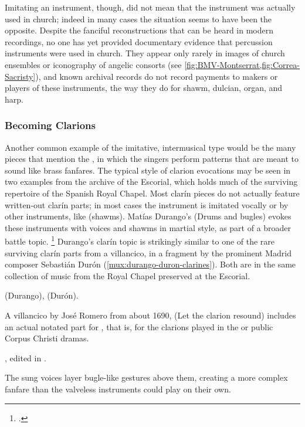 Imitating an instrument, though, did not mean that the instrument was actually
used in church; indeed in many cases the situation seems to have been the
opposite.
Despite the fanciful reconstructions that can be heard in modern recordings, no
one has yet provided documentary evidence that percussion instruments were used
in church.
They appear only rarely in images of church ensembles or iconography of angelic
consorts (see \cref{fig:BMV-Montserrat,fig:Correa-Sacristy}), and known
archival records do not record payments to makers or players of these
instruments, the way they do for shawm, dulcian, organ, and harp.%
    \citXXX[evidence needed]

\subsubsection{Becoming Clarions}

Another common example of the imitative, intermusical type would be the many
pieces that mention the  , in which the
singers perform patterns that are meant to sound like brass fanfares.
The typical style of clarion evocations may be seen in two examples from the
archive of the Escorial, which holds much of the surviving repertoire of the
Spanish Royal Chapel.
Most clarín pieces do not actually feature written-out clarín parts; in most
cases the instrument is imitated vocally or by other instruments, like
 (shawms).
Matías Durango's  (Drums and bugles) evokes these
instruments with voices and shawms in martial style, as part of a broader
battle topic.%
    \footnote{.}
Durango's clarín topic is strikingly similar to one of the rare surviving
clarín parts from a villancico, in a fragment by the prominent Madrid composer
Sebastián Durón (\cref{mux:durango-duron-clarines}). 
Both are in the same collection of music from the Royal Chapel preserved at the
Escorial.%
\begin{Footnote}
     (Durango),  (Durón).
\end{Footnote}
A villancico by José Romero from about 1690,  (Let the
clarion resound) includes an actual notated part for , that is, for the clarions played in the 
or public Corpus Christi dramas.%
\begin{Footnote} 
    , edited in \autocite[655--661]{CaberoPueyo:PhD}.
\end{Footnote}
The sung voices layer bugle-like gestures above them, creating a more complex
fanfare than the valveless instruments could play on their own.

